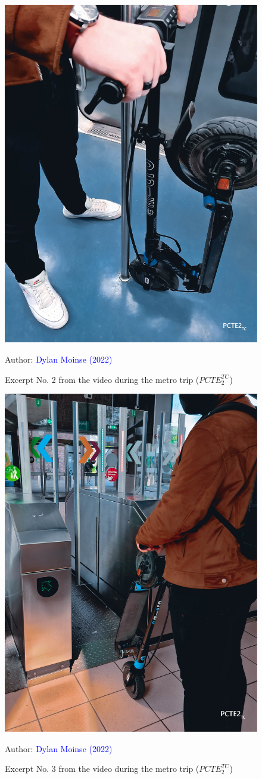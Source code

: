     \begin{figure}[h!]\vspace*{4pt}
        \caption*{Excerpt No. 2 from the video during the metro trip (\(PCTE^{TC}_{2}\))}
        \centerline{\includegraphics[width=0.5\columnwidth]{src/Figures/Annexes/Extrait_Video_PCTE2_TC_2.jpg}}
        \vspace{5pt}
        \begin{flushright}\scriptsize{
        Author: \textcolor{blue}{Dylan Moinse (2022)}
        }\end{flushright}
    \end{figure}
    
    \begin{figure}[h!]\vspace*{4pt}
        \caption*{Excerpt No. 3 from the video during the metro trip (\(PCTE^{TC}_{2}\))}
        \centerline{\includegraphics[width=0.5\columnwidth]{src/Figures/Annexes/Extrait_Video_PCTE2_TC_3.jpg}}
        \vspace{5pt}
        \begin{flushright}\scriptsize{
        Author: \textcolor{blue}{Dylan Moinse (2022)}
        }\end{flushright}
    \end{figure}

